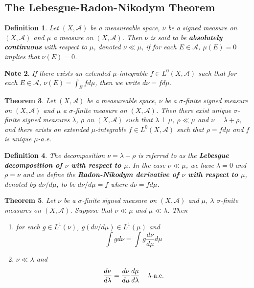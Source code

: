 \documentclass[12pt]{amsart}
\newtheorem{thm}{Theorem}[section]
\newtheorem{defn}[thm]{Definition}
\newtheorem{note}[thm]{Note}
\newcommand{\lam}{\lambda}
\newcommand{\sig}{\sigma}
\newcommand{\MA}{\mathcal{A}}
\begin{document}
\subsection{The Lebesgue-Radon-Nikodym Theorem}

\begin{defn}
Let $(X, \MA)$ be a measureable space, $\nu$ be a signed measure on $(X, \MA)$ and $\mu$ a measure on $(X,\MA)$. Then $\nu$ is said to be \textbf{absolutely continuous} with respect to $\mu$, denoted $\nu \ll \mu$, if for each $E \in \MA$, $\mu(E) = 0$ implies that $\nu(E) =0$. 
\end{defn}

\begin{note}
If there exists an extended $\mu$-integrable $f \in L^0(X, \MA)$ such that for each $E \in \MA$, $\nu(E) = \int_E f d\mu$, then we write $d\nu = f d\mu$.
\end{note}

\begin{thm}
Let $(X, \MA)$ be a measureable space, $\nu$ be a $\sig$-finite signed measure on $(X, \MA)$ and $\mu$ a $\sig$-finite measure on $(X,\MA)$. Then there exist unique $\sig$-finite signed measures $\lam$, $\rho$ on $(X, \MA)$ such that $\lam \perp \mu$, $\rho \ll \mu$ and $\nu = \lam + \rho$, and there exists an extended $\mu$-integrable $f \in L^0(X, \MA)$ such that $\rho = f d \mu$ and $f$ is unique $\mu$-a.e.  
\end{thm}

\begin{defn}
The decomposition $\nu = \lam + \rho$ is referred to as the \textbf{Lebesgue decomposition of $\nu$ with respect to $\mu$}. In the case $\nu \ll \mu$, we have $\lam = 0$ and $\rho = \nu$ and we define the \textbf{Radon-Nikodym derivative of $\nu$ with respect to $\mu$}, denoted by $d\nu/d\mu$, to be $d\nu/d\mu = f$ where $d\nu = fd\mu$.   
\end{defn}

\begin{thm}
Let $\nu$ be a $\sig$-finite signed measure on $(X, \MA)$ and $\mu$, $\lam$ $\sig$-finite measures on $(X,\MA)$. Suppose that $\nu \ll \mu$ and $\mu \ll \lam$. Then 
\begin{enumerate}
\item for each $g \in L^1(\nu)$, $g(d\nu/d\mu) \in  L^1(\mu)$ and $$\int g d\nu = \int g \frac{d\nu}{d\mu} d\mu$$
\item $\nu \ll \lam$ and $$\frac{d \nu}{d\lam} = \frac{d \nu}{d\mu} \frac{d\mu}{d\lam} \hspace{4mm} \lam \text{-a.e.}$$
\end{enumerate}
\end{thm}
\end{document}
